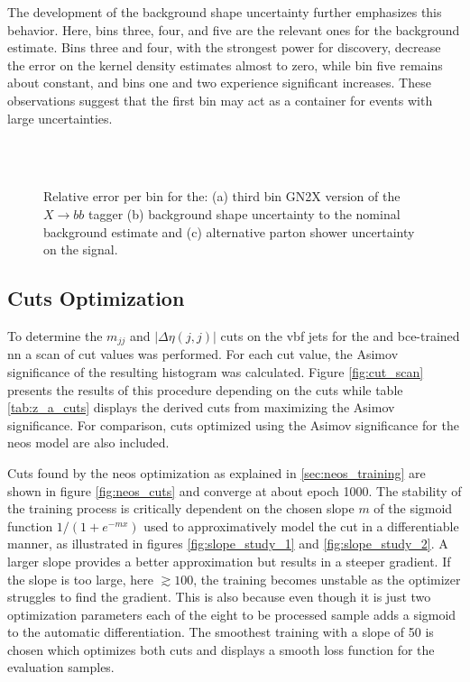 The development of the background shape uncertainty further emphasizes this behavior. Here, bins three, four, and five are the relevant ones for the background estimate. Bins three and four, with the strongest power for discovery, decrease the error on the kernel density estimates almost to zero, while bin five remains about constant, and bins one and two experience significant increases. These observations suggest that the first bin may act as a container for events with large uncertainties.




\begin{figure}
    \centering
    \\
    \\     \label{fig:neos_unc_dev_ps}
         \label{fig:neos_unc_dev_bkg_shape_sys}
    \caption[]{Relative error per bin for the: (a) third \pt bin GN2X version of the $X\rightarrow bb$ tagger (b) background shape uncertainty to the nominal background estimate and (c) alternative parton shower uncertainty on the signal.}
    \label{fig:neos_unc_dev}
\end{figure}

\subsection{Cuts Optimization}
To determine the $m_{jj}$ and $|\Delta\eta(j,j)|$ cuts on the \ac{vbf} jets  for the \mhh and \ac{bce}-trained \ac{nn} a scan of cut values was performed. For each cut value, the Asimov significance of the resulting histogram was calculated. Figure \ref{fig:cut_scan} presents the results of this procedure depending on the cuts while table \ref{tab:z_a_cuts} displays the derived cuts from maximizing the Asimov significance. For comparison, cuts optimized using the Asimov significance for the \ac{neos} model are also included.

Cuts found by the \ac{neos} optimization as explained in \ref{sec:neos_training} are shown in figure \ref{fig:neos_cuts} and converge at about epoch 1000. The stability of the training process is critically dependent on the chosen slope $m$ of the sigmoid function $1/(1+e^{-mx})$  used to approximatively model the cut in a differentiable manner, as illustrated in figures \ref{fig:slope_study_1} and \ref{fig:slope_study_2}. A larger slope provides a better approximation but results in a steeper gradient. If the slope is too large, here $\gtrsim 100$, the training becomes unstable as the optimizer struggles to find the gradient. This is also because even though it is just two optimization parameters each of the eight to be processed sample adds a sigmoid to the automatic differentiation. The smoothest training with a slope of 50 is chosen which optimizes both cuts and displays a smooth loss function for the evaluation samples.

